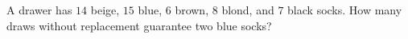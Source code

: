 A drawer has $14$ beige, $15$ blue, $6$ brown, $8$ blond, and $7$ black socks. How many draws without replacement guarantee two blue socks?
